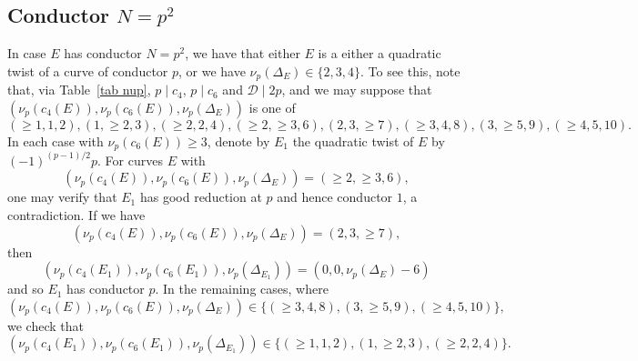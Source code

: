 \subsection{Conductor $N=p^2$}

In case $E$ has conductor $N=p^2$, we have that either $E$ is a either a quadratic twist of a curve of conductor $p$, or we have $\nu_p (\Delta_E) \in \{ 2, 3, 4 \}$.
To see this, note that, via  Table~\ref{tab nup}, $p \mid c_4$, $p \mid c_6$ and 
$\mathcal{D} \mid 2p$, and we may suppose that 
$(\nu_p (c_4(E)),  \nu_p (c_6(E)), \nu_p (\Delta_E) )$ is one of
$$
(\geq 1, 1, 2),   (1, \geq 2, 3),   (\geq 2, 2,4),
(\geq 2, \geq 3, 6),  (2,3,\geq 7),  (\geq 3, 4, 8), 
(3, \geq 5, 9 ), (\geq 4, 5, 10).
$$
In each case with $\nu_p (c_6(E)) \geq 3$, denote by $E_1$ the quadratic twist of $E$ by $(-1)^{(p-1)/2} p$. For curves $E$ with 
$$
(\nu_p (c_4(E)),  \nu_p (c_6(E)), \nu_p (\Delta_E) )=(\geq 2, \geq 3, 6), 
$$
one may verify that $E_1$ has good 
reduction at $p$ and hence conductor $1$, a contradiction. If we have
$$
(\nu_p (c_4(E)),  \nu_p (c_6(E)), \nu_p (\Delta_E) )=(2, 3, \geq 7),
$$
then
$$
(\nu_p (c_4(E_1)),  \nu_p (c_6(E_1)), \nu_p (\Delta_{E_1}) ) = (0, 0, \nu_p (\Delta_E)-6)
$$
and so $E_1$ has conductor $p$. In the remaining cases, where
$$
(\nu_p (c_4(E)),  \nu_p (c_6(E)), \nu_p (\Delta_E) ) \in \{ (\geq 3, 4, 8), (3, \geq 5, 9 ), (\geq 4, 5, 10) \},
$$
we check that
$$
(\nu_p (c_4(E_1)),  \nu_p (c_6(E_1)), \nu_p (\Delta_{E_1}) ) \in \{ (\geq 1, 1, 2),   (1, \geq 2, 3),   (\geq 2, 2,4) \}.
$$

